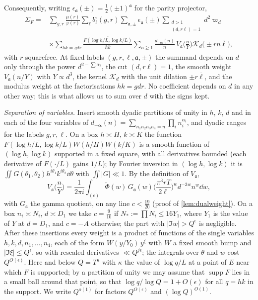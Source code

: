 \documentclass[11pt,colorlinks]{charlie}
\begin{document}
Consequently, writing $\epsilon_{\mathfrak a}(\pm)=\frac12(\pm1)^{\mathfrak a}$ for the parity projector,
\begin{equation}\label{eq:SigmaF}
 \begin{split}
 \Sigma_F={}&\sum_{g,r}\frac{\mu(r)}{\varphi(r)}\sum_\ell b^\circ_\ell(g,r)\sum_{\mathfrak a,\pm}\epsilon_{\mathfrak a}(\pm)\sum_{\substack{d>1\\(d,r\ell)=1}}d^2\varpi_d\\
 &\times\sum_{hk=gdr}\frac{\overline{F(\log h/L,\log k/L)}}{hk}\sum_{n\ge1}\frac{d_{-\boldsymbol\alpha}(n)}n\,V_{\mathfrak a}\Big(\frac n{Y}\Big)\mathscr K_d\big(\pm rn\overline\ell\big),
 \end{split}
\end{equation}
with $r$ squarefree. At fixed labels $(g,r,\ell,\mathfrak a,\pm)$ the summand depends on $d$ only through the power $d^{2-\sum\alpha_i}$, the cut $(d,r\ell)=1$, the smooth weight $V_{\mathfrak a}(n/Y)$ with $Y\propto d^3$, the kernel $\mathscr K_d$ with the unit dilation $\pm r\overline\ell$, and the modulus weight at the factorisations $hk=gdr$. No coefficient depends on $d$ in any other way; this is what allows us to sum over $d$ with the signs kept.

\emph{Separation of variables.} Insert smooth dyadic partitions of unity in $h$, $k$, $d$ and in each of the four variables of $d_{-\boldsymbol\alpha}(n)=\sum_{n_1n_2n_3n_4=n}\prod_in_i^{\alpha_i}$, and dyadic ranges for the labels $g,r,\ell$. On a box $h\asymp H$, $k\asymp K$ the function $\overline{F(\log h/L,\log k/L)}W(h/H)W(k/K)$ is a smooth function of $(\log h,\log k)$ supported in a fixed square, with all derivatives bounded (each derivative of $F(\cdot/L)$ gains $1/L$); by Fourier inversion in $(\log h,\log k)$ it is $\iint G(\theta_1,\theta_2)h^{i\theta_1}k^{i\theta_2}\dd\theta$ with $\iint|G|\ll1$. By the definition of $V_{\mathfrak a}$,
\[
 V_{\mathfrak a}\Big(\frac nY\Big)=\frac1{2\pi i}\int_{(c)}\widetilde\Phi(w)\,G_{\mathfrak a}(w)\Big(\frac{\pi^3rT}{2\ell}\Big)^{w}d^{-3w}n^w\dd w,
\]
with $G_{\mathfrak a}$ the gamma quotient, on any line $c<\frac{19}{20}$ (proof of \cref{lem:dualweight}). On a box $n_i\asymp N_i$, $d\asymp D_1$ we take $c=\frac9{10}$ if $N_*:=\prod N_i\le16Y_1$, where $Y_1$ is the value of $Y$ at $d=D_1$, and $c=-A$ otherwise; the part with $|\Im w|>Q^\epsilon$ is negligible. After these insertions every weight is a product of functions of the single variables $h,k,d,n_1,\dots,n_4$, each of the form $W(y/Y_0)\,y^{\xi}$ with $W$ a fixed smooth bump and $|\Im\xi|\le Q^\epsilon$, so with rescaled derivatives $\ll Q^{j\epsilon}$; the integrals over $\theta$ and $w$ cost $Q^{O(\epsilon)}$. Here and below $Q=T^{\kappa}$ with $\kappa$ the value of $\log q/L$ at a point of $E$ near which $F$ is supported; by a partition of unity we may assume that $\operatorname{supp}F$ lies in a small ball around that point, so that $\log q/\log Q=1+O(\epsilon)$ for all $q=hk$ in the support. We write $Q^{o(1)}$ for factors $Q^{O(\epsilon)}$ and $(\log Q)^{O(1)}$.
\end{document}
